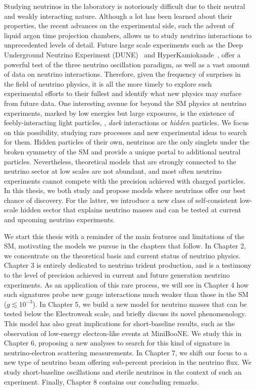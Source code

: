 \documentclass[openany,twoside,frontopenright,openright]{ip3thesis}
\begin{document}
Studying neutrinos in the laboratory is notoriously difficult due to their neutral and weakly interacting nature. Although a lot has been learned about their properties, the recent advances on the experimental side, such the advent of liquid argon time projection chambers, allows us to study neutrino interactions to unprecedented levels of detail. Future large scale experiments such as the Deep Underground Neutrino Experiment (DUNE)~\cite{Acciarri:2015uup} and HyperKamiokande~\cite{Abe:2018uyc}, offer a powerful test of the three neutrino oscillation paradigm, as well as a vast amount of data on neutrino interactions. Therefore, given the frequency of surprises in the field of neutrino physics, it is all the more timely to explore such experimental efforts to their fullest and identify what new physics may surface from future data.  One interesting avenue for beyond the SM physics at neutrino experiments, marked by low energies but large exposures, is the existence of feebly-interacting light particles, \eg, \emph{dark} interactions or \emph{hidden} particles. We focus on this possibility, studying rare processes and new experimental ideas to search for them. Hidden particles of their own, neutrinos are the only singlets under the broken symmetry of the SM and provide a unique portal to additional neutral particles. Nevertheless, theoretical models that are strongly connected to the neutrino sector at low scales are not abundant, and most often neutrino experiments cannot compete with the precision achieved with charged particles. In this thesis, we both study and propose models where neutrinos offer our best chance of discovery. For the latter, we introduce a new class of self-consistent low-scale hidden sector that explains neutrino masses and can be tested at current and upcoming neutrino experiments. 


We start this thesis with a reminder of the main features and limitations of the SM, motivating the models we pursue in the chapters that follow. In Chapter 2, we concentrate on the theoretical basis and current status of neutrino physics. Chapter 3 is entirely dedicated to neutrino trident production, and is a testimony to the level of precision achieved in current and future generation neutrino experiments. As an application of this rare process, we will see in Chapter 4 how such signatures probe new gauge interactions much weaker than those in the SM ($g \lesssim 10^{-3}$). In Chapter 5, we build a new model for neutrino masses that can be tested below the Electroweak scale, and briefly discuss its novel phenomenology. This model has also great implications for short-baseline results, such as the observation of low-energy electron-like events at MiniBooNE. We study this in Chapter 6, proposing a new analyses to search for this kind of signature in neutrino-electron scattering measurements. In Chapter 7, we shift our focus to a new type of neutrino beam offering sub-percent precision in the neutrino flux. We study short-baseline oscillations and sterile neutrinos in the context of such an experiment. Finally, Chapter 8 contains our concluding remarks.    
\end{document}
